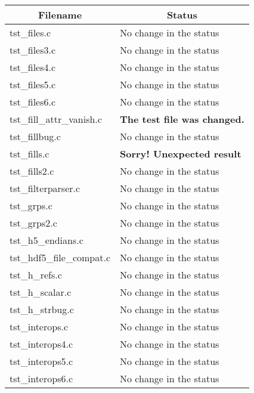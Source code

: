 \begin{table}[H]
\centering
\begin{tabular}{|l|l|}
\hline
\multicolumn{1}{|c|}{\parbox{4cm}{\centering Filename}} & \multicolumn{1}{c|}{Status} \\ \hline \hline
tst\_files.c            &  No change in the status             \\ \hline
tst\_files3.c           &  No change in the status             \\ \hline
tst\_files4.c           &  No change in the status             \\ \hline
tst\_files5.c           &  No change in the status             \\ \hline
tst\_files6.c           &  No change in the status             \\ \hline
tst\_fill\_attr\_vanish.c   &  \textbf{The test file was changed.}         \\ \hline
tst\_fillbug.c          &  No change in the status             \\ \hline
tst\_fills.c            &  \textbf{Sorry! Unexpected result}            \\ \hline
tst\_fills2.c           &  No change in the status             \\ \hline
tst\_filterparser.c     &   No change in the status            \\ \hline
tst\_grps.c             &   No change in the status            \\ \hline
tst\_grps2.c            &   No change in the status            \\ \hline
tst\_h5\_endians.c      &   No change in the status            \\ \hline
tst\_hdf5\_file\_compat.c   &   No change in the status        \\ \hline
tst\_h\_refs.c          &   No change in the status            \\ \hline
tst\_h\_scalar.c        &   No change in the status            \\ \hline
tst\_h\_strbug.c        &   No change in the status            \\ \hline
tst\_interops.c         &   No change in the status            \\ \hline
tst\_interops4.c        &   No change in the status            \\ \hline
tst\_interops5.c        &   No change in the status            \\ \hline
tst\_interops6.c        &   No change in the status            \\ \hline

\end{tabular}
\end{table}
